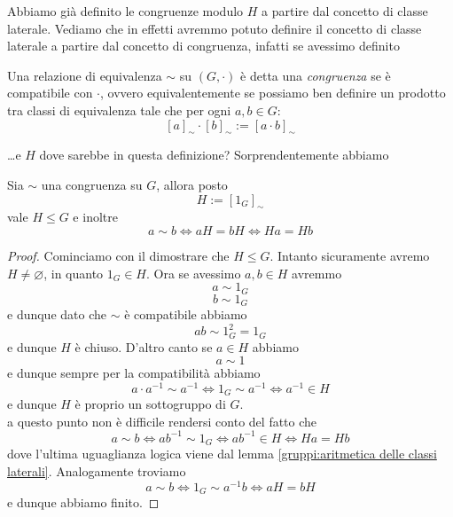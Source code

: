 \documentclass[11pt]{scrartcl}
\newcommand{\eset}{\varnothing}
\begin{document}
	Abbiamo già definito le congruenze modulo $H$ a partire dal concetto di classe laterale. Vediamo che in effetti avremmo potuto definire il concetto di classe laterale a partire dal concetto di congruenza, infatti se avessimo definito
	\begin{definition}
		Una relazione di equivalenza $\sim$ su $(G,\cdot)$ è detta una \textit{congruenza} se è compatibile con $\cdot$, ovvero equivalentemente se possiamo ben definire un prodotto tra classi di equivalenza tale che per ogni $a,b\in G$:
		$$[a]_\sim\cdot[b]_\sim:=[a\cdot b]_\sim$$
	\end{definition}
	\dots e $H$ dove sarebbe in questa definizione? Sorprendentemente abbiamo
	\begin{proposition}
		Sia $\sim$ una congruenza su $G$, allora posto
		$$H:=[1_G]_\sim$$
		vale $H\le G$ e inoltre 
		$$a\sim b \iff aH=bH \iff Ha=Hb$$
	\end{proposition}
	\begin{proof}
		Cominciamo con il dimostrare che $H\le G$. Intanto sicuramente avremo $H\ne \eset$, in quanto $1_G\in H$. Ora se avessimo $a,b\in H$ avremmo
		$$a\sim 1_G$$
		$$b\sim 1_G$$
		e dunque dato che $\sim$ è compatibile abbiamo
		$$ab\sim 1^2_G=1_G$$
		e dunque $H$ è chiuso. D'altro canto se $a\in H$ abbiamo
		$$a\sim 1$$
		e dunque sempre per la compatibilità abbiamo
		$$a\cdot a^{-1}\sim a^{-1}\iff 1_G\sim a^{-1}\iff a^{-1}\in H$$
		e dunque $H$ è proprio un sottogruppo di $G$. \\ 
		a questo punto non è difficile rendersi conto del fatto che 
		$$a\sim b \iff ab^{-1}\sim 1_G \iff ab^{-1}\in H \iff Ha=Hb$$
		dove l'ultima uguaglianza logica viene dal lemma \ref{gruppi:aritmetica delle classi laterali}. Analogamente troviamo
		$$a\sim b \iff 1_G\sim a^{-1}b \iff aH = bH$$
		e dunque abbiamo finito. 
	\end{proof}
	
\end{document}
